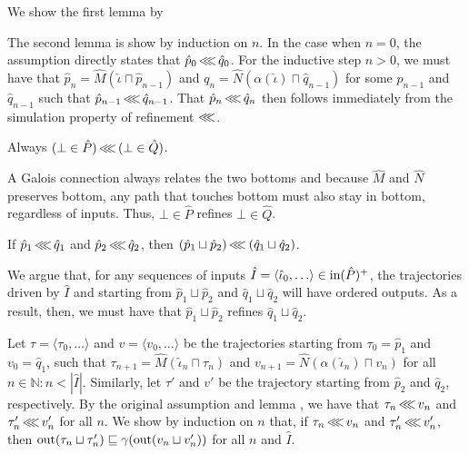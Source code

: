 We show the first lemma by 

The second lemma is show by induction on $n$. In the case when $n = 0$, the assumption directly states that $\hat p_{0} \operatorname{\lll} \hat q_{0}$. For the inductive step $n > 0$, we must have that $\hat p_{n} = \hat M(\hat \iota \sqcap \hat p_{n-1})$ and $q_{n} = \hat N(\alpha(\hat \iota) \sqcap \hat q_{n-1})$ for some $\hat p_{n-1}$ and $\hat q_{n-1}$ such that $\hat p_{n-1} \operatorname{\lll} \hat q_{n-1}$. That $\hat p_{n} \operatorname{\lll} \hat q_{n}$ then follows immediately from the simulation property of refinement $\operatorname{\lll}$.



\begin{lemma}
Always $(\bot \in \hat P) \operatorname{\lll} \, (\bot \in \hat Q)$.
\end{lemma}

A Galois connection always relates the two bottoms and because $\hat M$ and $\hat N$ preserves bottom, any path that touches bottom must also stay in bottom, regardless of inputs. Thus, $\bot \in \hat P$ refines $\bot \in \hat Q$.

\begin{lemma}
If $\hat p_{1} \operatorname{\lll} \hat q_{1}$ and $\hat p_{2} \operatorname{\lll} \hat q_{2}$, then $(\hat p_{1} \sqcup \hat p_{2}) \operatorname{\lll} \: (\hat q_{1} \sqcup \hat q_{2})$.
\end{lemma}

We argue that, for any sequences of inputs $\hat I = \langle \hat \iota_{0}, \ldots \rangle \in \operatorname{in}(\hat P)^{+}$, the trajectories driven by $\hat I$ and starting from $\hat p_{1} \sqcup \hat p_{2}$ and $\hat q_{1} \sqcup \hat q_{2}$ will have ordered outputs. As a result, then, we must have that $\hat p_{1} \sqcup \hat p_{2}$ refines $\hat q_{1} \sqcup \hat q_{2}$.


Let $\tau = \langle \tau_{0}, \ldots \rangle$ and $v = \langle v_{0}, \ldots \rangle$ be the trajectories starting from $\tau_{0} = \hat p_{1}$ and $v_{0} = \hat q_{1}$, such that $\tau_{n+1} = \hat M(\hat \iota_{n} \sqcap \tau_{n})$ and $v_{n+1} = \hat N(\alpha(\hat \iota_{n}) \sqcap v_{n})$ for all $n \in \mathbb{N} : n < | \hat I |$. Similarly, let $\tau'$ and $v'$ be the trajectory starting from $\hat p_{2}$ and $\hat q_{2}$, respectively. By the original assumption and lemma , we have that $\tau_{n} \operatorname{\lll} v_{n}$ and $\tau_{n}' \operatorname{\lll} v_{n}'$ for all $n$. We show by induction on $n$ that, if $\tau_{n} \operatorname{\lll} v_{n}$ and $\tau_{n}' \operatorname{\lll} v_{n}'$, then $\operatorname{out}(\tau_{n} \sqcup \tau_{n}') \sqsubseteq \gamma(\operatorname{out}(v_{n} \sqcup v_{n}'))$ for all $n$ and $\hat I$.

